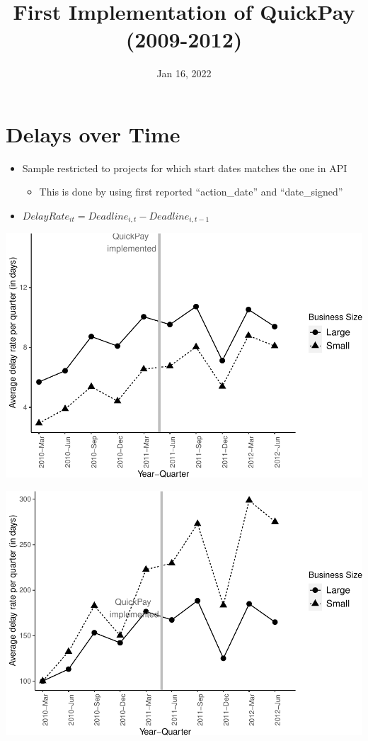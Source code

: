 \documentclass[
]{article}
\title{First Implementation of QuickPay (2009-2012)}
\author{}
\date{\vspace{-2.5em}Jan 16, 2022}
\providecommand{\tightlist}{%
  \setlength{\itemsep}{0pt}\setlength{\parskip}{0pt}}
\begin{document}
\maketitle

\hypertarget{delays-over-time}{%
\section{Delays over Time}\label{delays-over-time}}

\begin{itemize}
\tightlist
\item
  Sample restricted to projects for which start dates matches the one in
  API

  \begin{itemize}
  \tightlist
  \item
    This is done by using first reported ``action\_date'' and
    ``date\_signed''
  \end{itemize}
\item
  \(DelayRate_{it}=Deadline_{i,t} - Deadline_{i,t-1}\)
\end{itemize}

\includegraphics{qp_first_implementation_files/figure-latex/plot-1.pdf}

\includegraphics{qp_first_implementation_files/figure-latex/normalized_plot-1.pdf}
\end{document}
